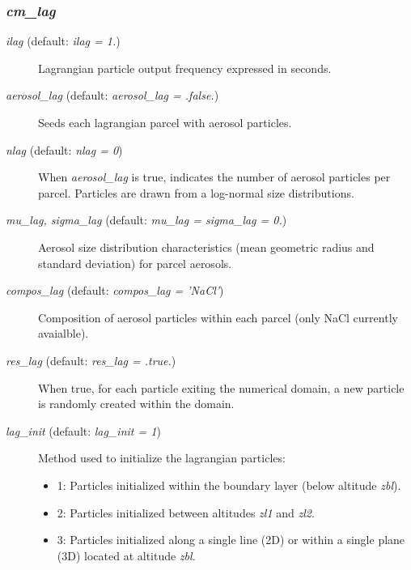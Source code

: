 \documentclass[12pt,A4,french]{article}
\begin{document}
\subsubsection{{\it cm\_lag}}

\begin{description}

\item[{\it ilag} (default: {\it ilag = 1.})]

Lagrangian particle output frequency expressed in seconds.

\item[{\it  aerosol\_lag} (default: {\it  aerosol\_lag = .false.})]

Seeds each lagrangian parcel with aerosol particles.

\item[{\it nlag} (default: {\it nlag = 0})]

When {\it aerosol\_lag} is true, indicates the number of aerosol particles per parcel. Particles are drawn from a log-normal size distributions.

\item[{\it mu\_lag, sigma\_lag} (default: {\it mu\_lag = sigma\_lag = 0.})]

Aerosol size distribution characteristics (mean geometric radius and standard deviation) for parcel aerosols.

\item[{\it compos\_lag} (default: {\it compos\_lag = 'NaCl'})]

Composition of aerosol particles within each parcel (only NaCl currently avaialble).

\item[{\it res\_lag} (default: {\it res\_lag = .true.})]

When true, for each particle exiting the numerical domain, a new particle is randomly created within the domain.

\item[{\it lag\_init} (default: {\it lag\_init = 1})]

Method used to initialize the lagrangian particles:
\begin{itemize}
    \item 1: Particles initialized within the boundary layer (below altitude {\it zbl}).\\
    \item 2: Particles initialized between altitudes {\it zl1} and {\it zl2}.\\
    \item 3: Particles initialized along a single line (2D) or within a single plane (3D) located at altitude {\it zbl}.\\
\end{itemize}


\end{description}
\end{document}
